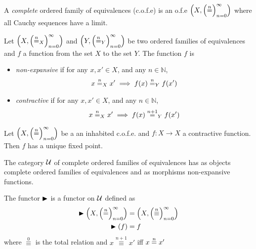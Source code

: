 \documentclass[format=acmsmall, review=true, screen=true]{acmart}
\newcommand{\nequal}[1][n]{\stackrel{\tiny{#1}}{=}}
\newcommand{\nats}{\mathbb{N}}
\begin{document}
\begin{definition}[c.o.f.e.] A \emph{complete} ordered family of equivalences
  (c.o.f.e) is an o.f.e $\left(X, \left( \nequal \right)_{n=0}^\infty \right)$
  where all Cauchy sequences have a limit.  
\end{definition}

\begin{definition}
  \label{def:nonexpansive-contractive-ofe}
  Let $\left(X, \seqn{\nequal_{X}}\right)$ and $\left(Y, \seqn{\nequal_{Y}}\right)$ be
  two ordered families of equivalences and $f$ a function from the set $X$ to the set $Y$.
  The function $f$ is 
  \begin{itemize}
  \item \emph{non-expansive} if for any $x, x' \in X$, and any $n \in \nats$,
    \begin{align*}
      x \nequal_X x' \implies f(x) \nequal_Y f(x')
    \end{align*}
  \item \emph{contractive} if for any $x, x' \in X$, and any $n \in \nats$,
    \begin{align*}
      x \nequal_X x' \implies f(x) \nequal[n+1]_Y f(x')
    \end{align*}
  \end{itemize}
\end{definition}

\begin{theorem}
  \label{thm:banach-fixed-point}
  Let $\left(X, \seqn{\nequal}\right)$ be a an inhabited c.o.f.e. and $f : X \to X$ a contractive
  function. Then $f$ has a unique fixed point.
\end{theorem}

\begin{definition}
  The category $\mathcal{U}$ of complete ordered families of equivalences has as objects complete
  ordered families of equivalences and as morphisms non-expansive functions.
\end{definition}

\begin{definition}
  \label{def:later-functor}
  The functor $\blacktriangleright$ is a functor on $\mathcal{U}$ defined as
  \begin{align*}
    \Later\left(X, \seqn{\nequal}\right) &= \left(X,
          \seqn{\overset{n}{\equiv}}\right)\\
    \Later(f) &= f
  \end{align*}
  where $\overset{0}{\equiv}$ is the total relation and $x \overset{n+1}{\equiv} x'$
  iff $x \nequal x'$
\end{definition}
\end{document}
